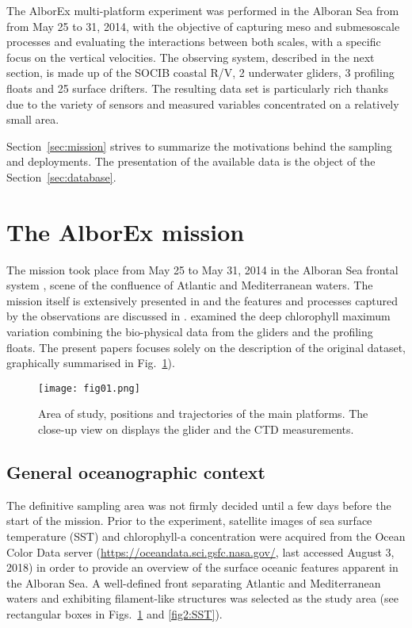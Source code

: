\documentclass[essd]{copernicus}
\begin{document}
The AlborEx multi-platform experiment was performed in the Alboran Sea from from May 25 to 31, 2014, with the objective of capturing meso and submesoscale processes and evaluating the interactions between both scales, with a specific focus on the vertical velocities. The observing system, described in the next section, is made up of the SOCIB coastal R/V, 2 underwater gliders, 3 profiling floats and 25 surface drifters. The resulting data set is particularly rich thanks due to the variety of sensors and measured variables concentrated on a relatively small area.

Section~\ref{sec:mission} strives to summarize the motivations behind the sampling and deployments. The presentation of the available data is the object of the Section~\ref{sec:database}.

\section{The AlborEx mission\label{sec:mission}}

The mission took place from May 25 to May 31, 2014 in the Alboran Sea frontal system \citep[][see Fig.~\ref{fig1:general}]{CHENEY78,TINTORE91}, scene of the confluence of Atlantic and Mediterranean waters. The mission itself is extensively presented in \citet{RUIZ2015} and the features and processes captured by the observations are discussed in \citet{PASCUAL2017}. \citet{OLITA17} examined the deep chlorophyll maximum variation combining the bio-physical data from the gliders and the profiling floats. The present papers focuses solely on the description of the original dataset, graphically summarised in Fig.~\ref{fig1:general}).

\begin{figure}[t]
\texttt{[image: fig01.png]}
\caption{Area of study, positions and trajectories of the main platforms. The close-up view on displays the glider and the CTD measurements.\label{fig1:general}}
\end{figure}

\subsection{General oceanographic context}

The definitive sampling area was not firmly decided until a few days before the start of the mission. Prior to the experiment, satellite images of sea surface temperature (SST) and chlorophyll-a concentration were acquired from the Ocean Color Data server (\url{https://oceandata.sci.gsfc.nasa.gov/}, last accessed August 3, 2018) in order to provide an overview of the surface oceanic features apparent in the Alboran Sea. A well-defined front separating Atlantic and Mediterranean waters and exhibiting filament-like structures was selected as the study area (see rectangular boxes in Figs.~\ref{fig1:general} and \ref{fig2:SST}). 
\end{document}
